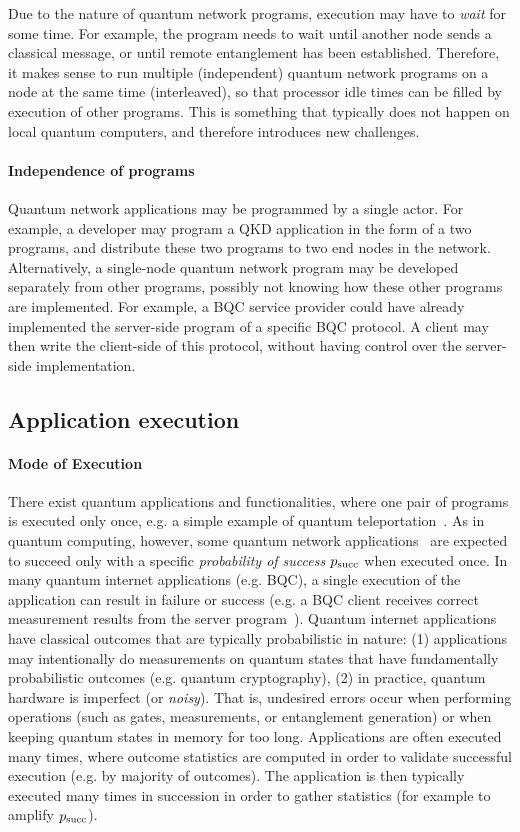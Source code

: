 Due to the nature of quantum network programs, execution may have to \textit{wait} for some time. For example, the program needs to wait until another node sends a classical message, or until remote entanglement has been established.
Therefore, it makes sense to run multiple (independent) quantum network programs on a node at the same time (interleaved), so that processor idle times can be filled by execution of other programs. This is something that typically does not happen on local quantum computers, and therefore introduces new challenges.

\paragraph{Independence of programs}
Quantum network applications may be programmed by a single actor.
For example, a developer may program a QKD application in the form of a two programs, and distribute these two programs to two end nodes in the network.
Alternatively, a single-node quantum network program may be developed separately from other programs, possibly not knowing how these other programs are implemented.
For example, a BQC service provider could have already implemented the server-side program of a specific BQC protocol.
A client may then write the client-side of this protocol, without having control over the server-side implementation.



\subsection{Application execution}

\paragraph{Mode of Execution}
There exist quantum applications and functionalities, where one pair of programs is executed only once, e.g. a simple example of quantum teleportation~\cite{bennett_1993_teleportation}.
As in quantum computing, however, some quantum network applications~\cite{wehner_2018_stages} are expected to succeed only with a specific \emph{probability of success} $p_{\rm succ}$ when executed once.
In many quantum internet applications (e.g. BQC), a single execution of the application can result in failure or success (e.g. a BQC client receives correct measurement results from the server program~\cite{leichtle2021verifying}).
Quantum internet applications have classical outcomes that are typically probabilistic in nature:
(1) applications may intentionally do measurements on quantum states that have fundamentally probabilistic outcomes (e.g. quantum cryptography),
(2) in practice, quantum hardware is imperfect (or \textit{noisy}). That is, undesired errors occur
when performing operations (such as gates, measurements, or entanglement generation) or when keeping quantum states in memory for too long.
Applications are often executed many times, where outcome statistics are computed in order to validate successful execution (e.g. by majority of outcomes).
The application is then typically executed many times in succession in order to gather statistics (for example to amplify $p_{\rm succ}$).


